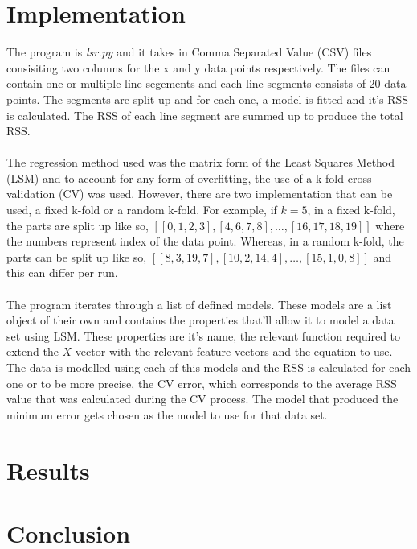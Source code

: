 \documentclass[a4paper,11pt]{article}
\begin{document}
\section{Implementation}
The program is \emph{lsr.py} and it takes in Comma Separated Value (CSV) files
consisiting two columns for the x and y data points respectively. The files can
contain one or multiple line segements and each line segments consists of 20
data points. The segments are split up and for each one, a model is fitted
and it's RSS is calculated. The RSS of each line segment are summed up to
produce the total RSS.
\\ \\
The regression method used was the matrix form of the Least Squares Method (LSM)
and to account for any form of overfitting, the use of a k-fold cross-validation (CV)
was used. However, there are two implementation that can be used, a fixed k-fold
or a random k-fold. For example, if $k = 5$, in a fixed k-fold, the parts are split up
like so, $[[0, 1, 2, 3], [4, 6, 7, 8], \dots, [16, 17, 18, 19]]$ where the
numbers represent index of the data point. Whereas, in a random k-fold, the parts
can be split up like so, $[[8, 3, 19, 7], [10, 2, 14, 4], \dots, [15, 1, 0, 8]]$
and this can differ per run. 
\\ \\
The program iterates through a list of defined models. These models are a list
object of their own and contains the properties that'll allow it to model a
data set using LSM. These properties are it's name, the relevant function required
to extend the $X$ vector with the relevant feature vectors and the equation
to use. The data is modelled using each of this models and the RSS is calculated
for each one or to be more precise, the CV error, which corresponds to the average
RSS value that was calculated during the CV process. The model that produced the
minimum error gets chosen as the model to use for that data set.

\section{Results}

\section{Conclusion}
\end{document}

